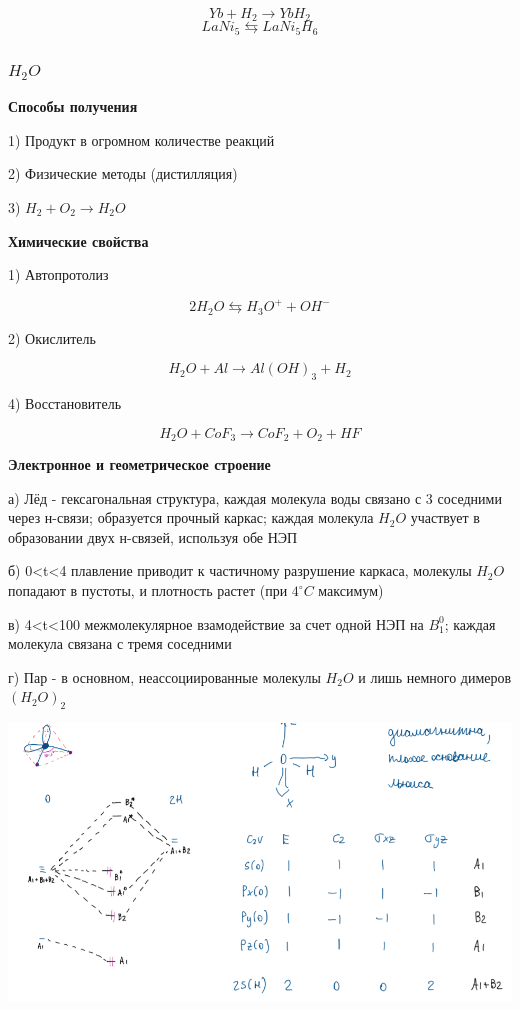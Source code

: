 $$Yb + H_2 \rightarrow YbH_2$$
$$LaNi_5 \leftrightarrows LaNi_5H_6$$

\subsubsection*{$H_2O$}

\textbf{Способы получения}

1) Продукт в огромном количестве реакций

2) Физические методы (дистилляция)

3) $H_2 + O_2 \rightarrow H_2O$

\textbf{Химические свойства}

1) Автопротолиз

$$2H_2O \leftrightarrows H_3O^+ + OH^-$$

2) Окислитель

$$H_2O + Al \rightarrow Al(OH)_3 + H_2$$

4) Восстановитель

$$H_2O + CoF_3 \rightarrow CoF_2 + O_2 + HF$$

\textbf{Электронное и геометрическое строение}

а) Лёд - гексагональная структура, каждая молекула воды связано с 3 соседними через н-связи; образуется прочный каркас; каждая молекула $H_2O$ участвует в образовании двух н-связей, используя обе НЭП

б) 0<t<4 плавление приводит к частичному разрушение каркаса, молекулы  $H_2O$ попадают в пустоты, и плотность растет (при $4^{\circ}C$ максимум)

в) 4<t<100 межмолекулярное взамодействие за счет одной НЭП на $B_1^0$; каждая молекула связана с тремя соседними

г) Пар - в основном, неассоциированные молекулы $H_2O$ и лишь немного димеров $(H_2O)_2$

\includegraphics{images/12v2.png}

